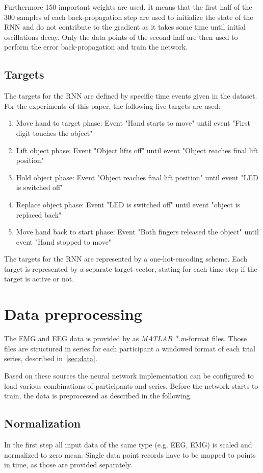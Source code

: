 \documentclass{article} %
\begin{document}
Furthermore 150 important weights are used.
It means that the first half of the 300 samples of each back-propagation step are used to initialize the state of the RNN and do not contribute to the gradient as it takes some time until initial oscillations decay.
Only the data points of the second half are then used to perform the error back-propagation and train the network.

\subsection{Targets}
The targets for the RNN are defined by specific time events given in the dataset. For the experiments of this paper, the following five targets are used:
\begin{enumerate}
	\item Move hand to target phase: Event "Hand starts to move"  until event "First digit touches the object"
	\item Lift object phase: Event "Object lifts off" until event "Object reaches final lift position"
	\item Hold object phase: Event "Object reaches final lift position" until event "LED is switched off"
	\item Replace object phase: Event "LED is switched off" until event "object is replaced back"
	\item Move hand back to start phase: Event "Both fingers released the object" until event "Hand stopped to move"
\end{enumerate}
The targets for the RNN are represented by a one-hot-encoding scheme.
Each target is represented by a separate target vector, stating for each time step if the target is active or not.

\section{Data preprocessing}
The EMG and EEG data is provided by \cite{nature} as \textit{MATLAB} \textit{*.m}-format files.
Those files are structured in series for each participant a windowed format of each trial series, described in~\ref{sec:data}.

Based on these sources the neural network implementation can be configured to load various combinations of participants and series.
Before the network starts to train, the data is preprocessed as described in the following.

\subsection{Normalization}
In the first step all input data of the same type (e.g. EEG, EMG) is scaled and normalized to zero mean.
Single data point records have to be mapped to points in time, as those are provided separately.
\end{document}
